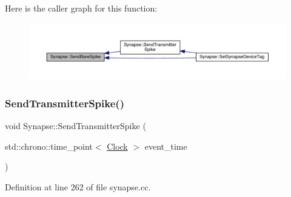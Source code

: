 Here is the caller graph for this function\+:\nopagebreak
\begin{figure}[H]
\begin{center}
\leavevmode
\includegraphics[width=350pt]{class_synapse_a0e28e56ecea170443fdd9722622da6b9_icgraph}
\end{center}
\end{figure}
\mbox{\label{class_synapse_a4147d3bea8f21918f88bea334f9c4abc}} 
\subsubsection{\texorpdfstring{Send\+Transmitter\+Spike()}{SendTransmitterSpike()}}
{\footnotesize\ttfamily void Synapse\+::\+Send\+Transmitter\+Spike (\begin{DoxyParamCaption}\item[{std\+::chrono\+::time\+\_\+point$<$ \hyperlink{universe_8h_a0ef8d951d1ca5ab3cfaf7ab4c7a6fd80}{Clock} $>$}]{event\+\_\+time }\end{DoxyParamCaption})}



Definition at line 262 of file synapse.\+cc.

